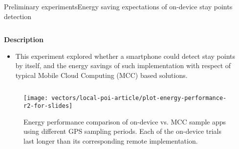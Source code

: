 \begin{frame}{Preliminary experiments}{Energy saving expectations of on-device stay points detection}
\small
\begin{columns}
\begin{column}{0.55\textwidth}
\begin{block}{\small \textbf{Description}}
\begin{itemize}
  \item This experiment explored whether a smartphone could detect stay points by itself, and the energy savings of such implementation with respect of typical Mobile Cloud Computing (MCC) based solutions.
\end{itemize}
\end{block}
\end{column}

\begin{column}{0.4\textwidth}
\begin{table}
\centering
\renewcommand{\arraystretch}{0.8}
\caption{Input parameters for the energy saving expectations of on-device stay points detection experiment.}
\label{tab:exp-energy-performance-input-parameters}
\end{table}
\end{column}
\end{columns}

\begin{figure}
  \centering
  \texttt{[image: vectors/local-poi-article/plot-energy-performance-r2-for-slides]}
  \caption{Energy performance comparison of on-device vs. MCC sample apps using different GPS sampling periods. Each of the on-device trials last longer than its corresponding remote implementation.}
\end{figure}

\end{frame}

